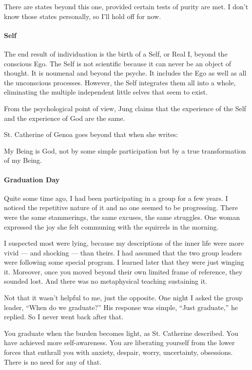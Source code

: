 There are states beyond this one, provided certain tests of purity are met. I don't know those states personally, so I'll hold off for now.

\paragraph{Self}
The end result of individuation is the birth of a Self, or Real I, beyond the conscious Ego. The Self is not scientific because it can never be an object of thought. It is noumenal and beyond the psyche. It includes the Ego as well as all the unconscious processes. However, the Self integrates them all into a whole, eliminating the multiple independent little selves that seem to exist.

From the psychological point of view, Jung claims that the experience of the Self and the experience of God are the same.

St. Catherine of Genoa goes beyond that when she writes:

\begin{quotex}
My Being is God, not by some simple participation but by a true transformation of my Being. 

\end{quotex}
\paragraph{Graduation Day}
Quite some time ago, I had been participating in a group for a few years. I noticed the repetitive nature of it and no one seemed to be progressing. There were the same stammerings, the same excuses, the same struggles. One woman expressed the joy she felt communing with the squirrels in the morning.

I suspected most were lying, because my descriptions of the inner life were more vivid — and shocking — than theirs. I had assumed that the two group leaders were following some special program. I learned later that they were just winging it. Moreover, once you moved beyond their own limited frame of reference, they sounded lost. And there was no metaphysical teaching sustaining it.

Not that it wasn't helpful to me, just the opposite. One night I asked the group leader, “When do we graduate?” His response was simple, “Just graduate,” he replied. So I never went back after that.

You graduate when the burden becomes light, as St. Catherine described. You have achieved more self-awareness. You are liberating yourself from the lower forces that enthrall you with anxiety, despair, worry, uncertainty, obsessions. There is no need for any of that.



